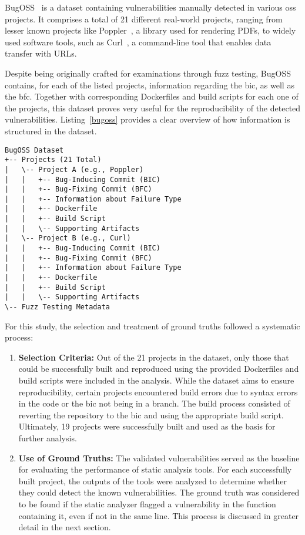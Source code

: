 BugOSS~\cite{BugOSS} is a dataset containing vulnerabilities manually detected in various \acl{oss} projects.
It comprises a total of 21 different real-world projects, ranging from lesser known projects like Poppler~\cite{poppler}, a library used for rendering PDFs, to widely used software tools, such as Curl~\cite{curl}, a command-line tool that enables data transfer with URLs.

Despite being originally crafted for examinations through fuzz testing, BugOSS contains, for each of the listed projects, information regarding the \ac{bic}, as well as the \ac{bfc}. 
Together with corresponding Dockerfiles and build scripts for each one of the projects, this dataset proves very useful for the reproducibility of the detected vulnerabilities.
Listing~\ref{bugoss} provides a clear overview of how information is structured in the dataset.

\begin{lstlisting}[caption={Hierarchy of the BugOSS dataset}, label={bugoss}]
BugOSS Dataset
+-- Projects (21 Total)
|   \-- Project A (e.g., Poppler)
|   |   +-- Bug-Inducing Commit (BIC)
|   |   +-- Bug-Fixing Commit (BFC)
|   |   +-- Information about Failure Type
|   |   +-- Dockerfile
|   |   +-- Build Script
|   |   \-- Supporting Artifacts
|   \-- Project B (e.g., Curl)
|   |   +-- Bug-Inducing Commit (BIC)
|   |   +-- Bug-Fixing Commit (BFC)
|   |   +-- Information about Failure Type
|   |   +-- Dockerfile
|   |   +-- Build Script
|   |   \-- Supporting Artifacts
\-- Fuzz Testing Metadata
\end{lstlisting}

For this study, the selection and treatment of ground truths followed a systematic process:
\begin{enumerate}
    \item \textbf{Selection Criteria:} Out of the 21 projects in the dataset, only those that could be successfully built and reproduced using the provided Dockerfiles and build scripts were included in the analysis. While the dataset aims to ensure reproducibility, certain projects encountered build errors due to syntax errors in the code or the \ac{bic} not being in a branch. The build process consisted of reverting the repository to the \ac{bic} and using the appropriate build script. Ultimately, 19 projects were successfully built and used as the basis for further analysis.

    \item \textbf{Use of Ground Truths:} The validated vulnerabilities served as the baseline for evaluating the performance of static analysis tools. For each successfully built project, the outputs of the tools were analyzed to determine whether they could detect the known vulnerabilities. The ground truth was considered to be found if the static analyzer flagged a vulnerability in the function containing it, even if not in the same line. This process is discussed in greater detail in the next section.
\end{enumerate}

